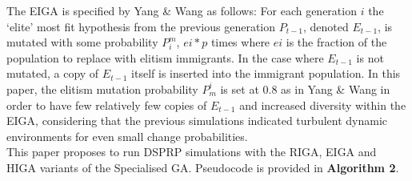 \documentclass[
	a4paper, %
	10pt, %
	unnumberedsections, %
	twoside, %
]{LTJournalArticle}
\begin{document}
The EIGA is specified by Yang \& Wang as follows: For each generation \(i\) the `elite' most fit hypothesis from the previous generation \(P_{t-1}\), denoted \(E_{t-1}\), is mutated with some probability \(P_{i}^{m}\), \(ei * p\) times where \(ei\) is the fraction of the population to replace with elitism immigrants. In the case where \(E_{t-1}\) is not mutated, a copy of \(E_{t-1}\) itself is inserted into the immigrant population. In this paper, the elitism mutation probability \(P^{i}_{m}\) is set at \(0.8\) as in Yang \& Wang \cite{yang:10} in order to have few relatively few copies of \(E_{t-1}\) and increased diversity within the EIGA, considering that the previous simulations indicated turbulent dynamic environments for even small change probabilities. \\

This paper proposes to run DSPRP simulations with the RIGA, EIGA and HIGA variants of the Specialised GA. Pseudocode is provided in \textbf{Algorithm 2}. 
\end{document}
